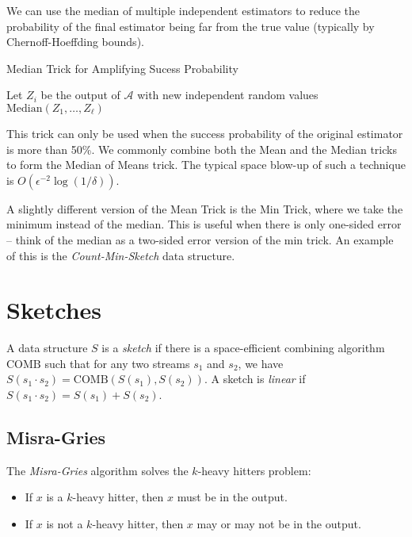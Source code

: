 \documentclass{article}
\begin{document}
We can use the median of multiple independent estimators to reduce the probability of the final estimator being far from the true value (typically by Chernoff-Hoeffding bounds).

\begin{algorithm}
  \caption{Median Trick for Amplifying Sucess Probability}
  \begin{algorithmic}[1]
    \State Let $Z_i$ be the output of $\mathcal{A}$ with new independent random values
    \EndFor
    \State \Return $\text{Median}(Z_1, \ldots, Z_\ell)$
    \EndProcedure
  \end{algorithmic}
\end{algorithm}

This trick can only be used when the success probability of the original estimator is more than 50\%.
We commonly combine both the Mean and the Median tricks to form the Median of Means trick.
The typical space blow-up of such a technique is $O(\epsilon^{-2} \log (1 / \delta))$.

A slightly different version of the Mean Trick is the Min Trick, where we take the minimum instead of the median.
This is useful when there is only one-sided error -- think of the median as a two-sided error version of the min trick.
An example of this is the \emph{Count-Min-Sketch} data structure.

\pagebreak

\section{Sketches}

\begin{definition}
  A data structure $S$ is a \emph{sketch} if there is a space-efficient combining algorithm $\text{COMB}$ such that for any two streams $s_1$ and $s_2$, we have $S(s_1 \cdot s_2) = \text{COMB}(S(s_1), S(s_2))$.
  A sketch is \emph{linear} if $S(s_1 \cdot s_2) = S(s_1) + S(s_2)$.
\end{definition}

\subsection{Misra-Gries}

The \emph{Misra-Gries} algorithm solves the $k$-heavy hitters problem:
\begin{itemize}
\item If $x$ is a $k$-heavy hitter, then $x$ must be in the output.
\item If $x$ is not a $k$-heavy hitter, then $x$ may or may not be in the output.
\end{itemize}
\end{document}
